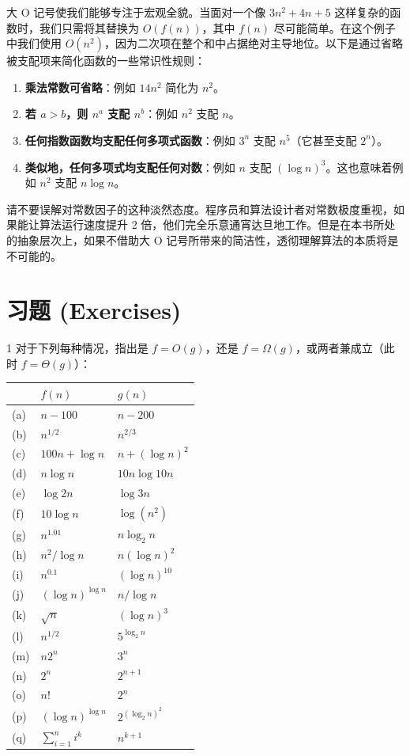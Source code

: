 大 O 记号使我们能够专注于宏观全貌。当面对一个像 $3n^2 + 4n + 5$ 这样复杂的函数时，我们只需将其替换为 $O(f(n))$，其中 $f(n)$ 尽可能简单。在这个例子中我们使用 $O(n^2)$，因为二次项在整个和中占据绝对主导地位。以下是通过省略被支配项来简化函数的一些常识性规则：
\begin{enumerate}
    \item \textbf{乘法常数可省略}：例如 $14n^2$ 简化为 $n^2$。
    \item \textbf{若 $a > b$，则 $n^a$ 支配 $n^b$}：例如 $n^2$ 支配 $n$。
    \item \textbf{任何指数函数均支配任何多项式函数}：例如 $3^n$ 支配 $n^5$（它甚至支配 $2^n$）。
    \item \textbf{类似地，任何多项式均支配任何对数}：例如 $n$ 支配 $(\log n)^3$。这也意味着例如 $n^2$ 支配 $n \log n$。
\end{enumerate}

请不要误解对常数因子的这种淡然态度。程序员和算法设计者对常数极度重视，如果能让算法运行速度提升 2 倍，他们完全乐意通宵达旦地工作。但是在本书所处的抽象层次上，如果不借助大 O 记号所带来的简洁性，透彻理解算法的本质将是不可能的。

\newpage
\section*{习题 (Exercises)}

\begin{exercise}{1}
对于下列每种情况，指出是 $f = O(g)$，还是 $f = \Omega(g)$，或两者兼成立（此时 $f = \Theta(g)$）：
\begin{center}
\begin{tabular}{lll}
& $f(n)$ & $g(n)$ \\
\hline
(a) & $n - 100$ & $n - 200$ \\
(b) & $n^{1/2}$ & $n^{2/3}$ \\
(c) & $100n + \log n$ & $n + (\log n)^2$ \\
(d) & $n \log n$ & $10n \log 10n$ \\
(e) & $\log 2n$ & $\log 3n$ \\
(f) & $10 \log n$ & $\log(n^2)$ \\
(g) & $n^{1.01}$ & $n \log_2 n$ \\
(h) & $n^2 / \log n$ & $n (\log n)^2$ \\
(i) & $n^{0.1}$ & $(\log n)^{10}$ \\
(j) & $(\log n)^{\log n}$ & $n / \log n$ \\
(k) & $\sqrt{n}$ & $(\log n)^3$ \\
(l) & $n^{1/2}$ & $5^{\log_2 n}$ \\
(m) & $n 2^n$ & $3^n$ \\
(n) & $2^n$ & $2^{n+1}$ \\
(o) & $n!$ & $2^n$ \\
(p) & $(\log n)^{\log n}$ & $2^{(\log_2 n)^2}$ \\
(q) & $\sum_{i=1}^n i^k$ & $n^{k+1}$ \\
\hline
\end{tabular}
\end{center}
\end{exercise}


